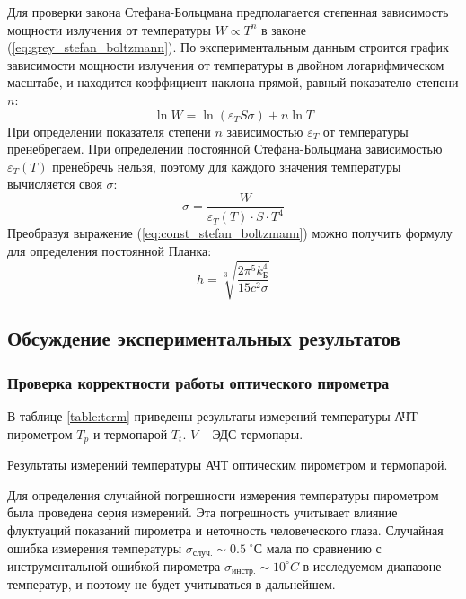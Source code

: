 \documentclass[10pt,a4paper]{article}
\newcommand{\cels}{\; ^\circ С}
\begin{document}
\begin{multicols}{2}
	Для проверки закона Стефана-Больцмана предполагается степенная зависимость мощности излучения от температуры $W \propto T^n$ в законе (\ref{eq:grey_stefan_boltzmann}). По экспериментальным данным строится график зависимости мощности излучения от температуры в двойном логарифмическом масштабе, и находится коэффициент наклона прямой, равный показателю степени $n$:
	\begin{equation}
		\ln W = \ln (\varepsilon_T S \sigma) + n \ln T
		\label{eq:lin_grey_stefan_boltzmann}
	\end{equation}
	При определении показателя степени $n$ зависимостью $\varepsilon_T$ от температуры пренебрегаем. При определении постоянной Стефана-Больцмана зависимостью $\varepsilon_T(T)$ пренебречь нельзя, поэтому для каждого значения температуры вычисляется своя $\sigma$:
	\begin{equation}
		\sigma = \frac{W}{\varepsilon_T(T) \cdot S \cdot T^4}
		\label{eq:calc_const_stefan_boltzman}
	\end{equation}
	Преобразуя выражение (\ref{eq:const_stefan_boltzmann}) можно получить формулу для определения постоянной Планка:
	\begin{equation}
		h = \sqrt[3]{\frac{2 \pi^5 k_Б^4}{15 c^2 \sigma}}
		\label{eq:calc_const_planck}
	\end{equation}
	
	\subsection*{Обсуждение экспериментальных результатов}
		
	\subsubsection*{Проверка корректности работы оптического пирометра}
	
	В таблице \ref{table:term} приведены результаты измерений температуры АЧТ пирометром $T_p$ и термопарой $T_t$. $V$ -- ЭДС термопары.
	
	\begin{table}[H]
		\addtolength{\tabcolsep}{-4pt}
		\footnotesize
			
		\caption{Результаты измерений температуры АЧТ оптическим пирометром и термопарой.}
		\label{table:term}
	\end{table}
	
	Для определения случайной погрешности измерения температуры пирометром была проведена серия измерений. Эта погрешность учитывает влияние флуктуаций показаний пирометра и неточность человеческого глаза. Случайная ошибка измерения температуры $\sigma_{случ.} \sim 0.5 \cels$ мала по сравнению с инструментальной ошибкой пирометра $\sigma_{инстр.} \sim 10^\circ C$ в исследуемом диапазоне температур, и поэтому не будет учитываться в дальнейшем.
	

\end{multicols}
\end{document}
